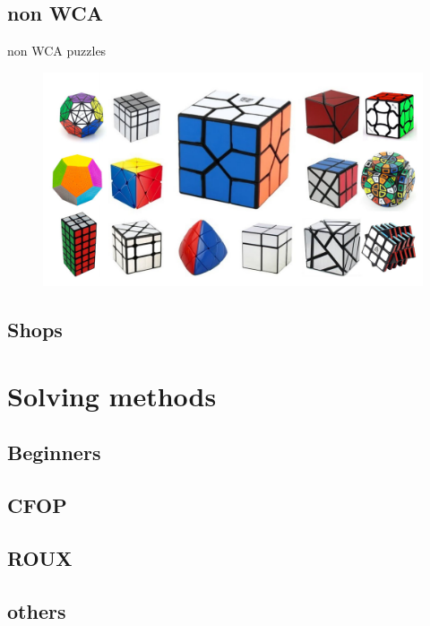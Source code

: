 \documentclass{beamer}
\begin{document}
        \subsection{non WCA}
            \begin{frame}{non WCA puzzles}
                \begin{figure}
                    \includegraphics[width=\textwidth]{nonWCAall.jpg}
                \end{figure}
            \end{frame}
        \subsection{Shops}
    \section{Solving methods}
        \subsection{Beginners}
        \subsection{CFOP}
        \subsection{ROUX}
        \subsection{others}
\end{document}
